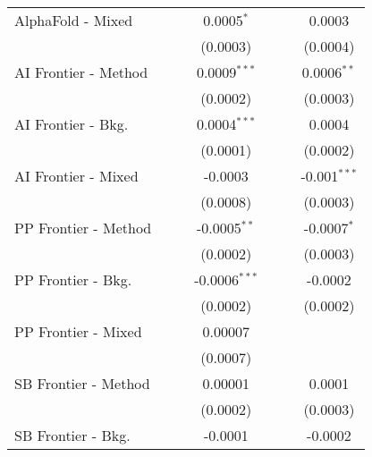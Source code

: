 \begin{tabular}{lcccccc}
   AlphaFold - Mixed    &               &               & 0.0005$^{*}$    &               &               & 0.0003\\   
                        &               &               & (0.0003)        &               &               & (0.0004)\\   
   AI Frontier - Method &               &               & 0.0009$^{***}$  &               &               & 0.0006$^{**}$\\   
                        &               &               & (0.0002)        &               &               & (0.0003)\\   
   AI Frontier - Bkg.   &               &               & 0.0004$^{***}$  &               &               & 0.0004\\   
                        &               &               & (0.0001)        &               &               & (0.0002)\\   
   AI Frontier - Mixed  &               &               & -0.0003         &               &               & -0.001$^{***}$\\   
                        &               &               & (0.0008)        &               &               & (0.0003)\\   
   PP Frontier - Method &               &               & -0.0005$^{**}$  &               &               & -0.0007$^{*}$\\   
                        &               &               & (0.0002)        &               &               & (0.0003)\\   
   PP Frontier - Bkg.   &               &               & -0.0006$^{***}$ &               &               & -0.0002\\   
                        &               &               & (0.0002)        &               &               & (0.0002)\\   
   PP Frontier - Mixed  &               &               & 0.00007         &               &               &   \\   
                        &               &               & (0.0007)        &               &               &   \\   
   SB Frontier - Method &               &               & 0.00001         &               &               & 0.0001\\   
                        &               &               & (0.0002)        &               &               & (0.0003)\\   
   SB Frontier - Bkg.   &               &               & -0.0001         &               &               & -0.0002\\   

\end{tabular}
